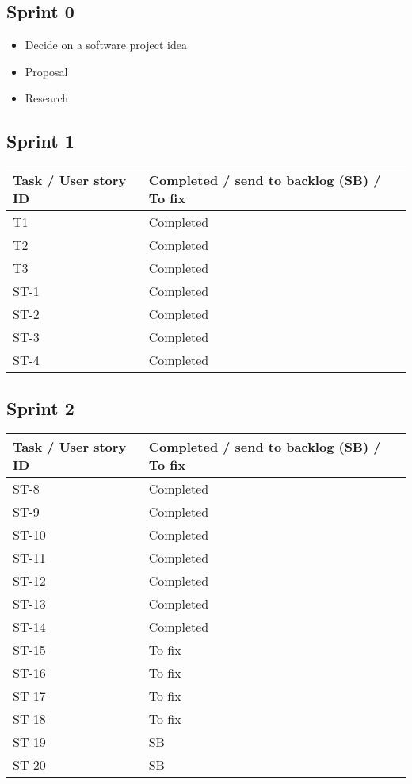\documentclass[12pt]{article}
\begin{document}
\subsection{Sprint 0}
\begin{itemize}
\item Decide on a software project idea
\item Proposal
\item Research
\end{itemize}

\subsection{Sprint 1}
{
\centering
\begin{longtable}{| p{7cm} | p{7cm}|}
			\hline			
			\textbf{Task / User story ID} & \textbf{Completed / send to backlog (SB) / To fix }
			\\ \hline 
             T1 & Completed \\ \hline
             \hline  T2 & Completed\\ \hline
             \hline  T3 & Completed\\ \hline
			 \hline  ST-1 & Completed \\ \hline
             \hline  ST-2 & Completed \\ \hline
             \hline  ST-3 & Completed \\ \hline
             \hline  ST-4 & Completed \\ \hline
            
\end{longtable}
}

\subsection{Sprint 2}
{
\centering
\begin{longtable}{| p{7cm} | p{7cm}|}
			\hline			
			\textbf{Task / User story ID} & \textbf{Completed / send to backlog (SB) / To fix }
			 \\ \hline  ST-8 & Completed \\ \hline
             \hline  ST-9 & Completed \\ \hline
             \hline  ST-10 & Completed \\ \hline
             \hline  ST-11 & Completed \\ \hline
             \hline  ST-12 & Completed \\ \hline
             \hline  ST-13 & Completed \\ \hline
             \hline  ST-14 & Completed \\ \hline
             \hline  ST-15 & To fix \\ \hline
             \hline  ST-16 & To fix \\ \hline 
             \hline  ST-17 & To fix \\ \hline
             \hline  ST-18 & To fix \\ \hline
             \hline  ST-19 & SB \\ \hline
             \hline  ST-20 & SB \\ \hline
\end{longtable}
}
\end{document}
